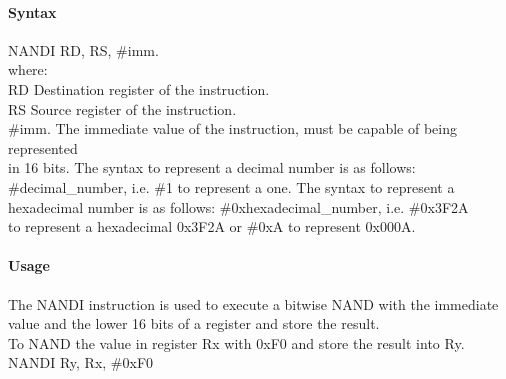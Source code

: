 \documentclass[12pt]{article}
\begin{document}
    \paragraph{Syntax}
    \begin{flushleft}
    NANDI RD, RS, \#imm.\\
    \vspace{1em}        %
    where:\\
    \vspace{1em}
    RD  \hspace{3.6em} Destination register of the instruction.\\
    \vspace{1em}
    RS  \hspace{3.85em} Source register of the instruction.\\
    \vspace{1em}
    \#imm.  \hspace{1.8em} The immediate value of the instruction, must be capable of being represented\\             \hspace{5.4em} in 16 bits. The syntax to represent a decimal number is as follows:\\
            \hspace{5.4em} \#decimal\_number, i.e. \#1 to represent a one. The syntax to represent a\\
            \hspace{5.4em} hexadecimal number is as follows: \#0xhexadecimal\_number, i.e. \#0x3F2A \\
            \hspace{5.4em} to represent a hexadecimal 0x3F2A or \#0xA to represent 0x000A.\\
    \end{flushleft}
    
    \paragraph{Usage}
    \begin{flushleft}
    The NANDI instruction is used to execute a bitwise NAND with the immediate value and the lower 16 bits of a register and store the result.\\    
    \vspace{1em}
    To NAND the value in register Rx with 0xF0 and store the result into Ry.\\
    \vspace{1em}
    NANDI Ry, Rx, \#0xF0
    \end{flushleft}
    
\end{document}
